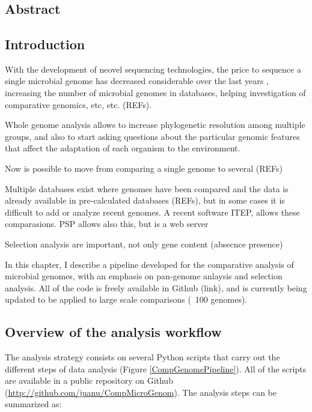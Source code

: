 \chapter{}

\section{Abstract}

\section{Introduction}

With the development of neovel sequencing technologies, the price to sequence a single microbial genome has decreased considerable over the last years \cite{Mardis:2013gn}, increasing the number of microbial genomes in databases, helping investigation of comparative genomics, etc, etc. (REFs). 

Whole genome analysis allows to increase phylogenetic resolution among multiple groups, and also to start asking questions about the particular genomic features that affect the adaptation of each organism to the environment.

Now is possible to move from comparing a single genome to several (REFs)

Multiple databases exist where genomes have been compared and the data is already available in pre-calculated databases (REFs), but in some cases it is difficult to add or analyze recent genomes. A recent software ITEP, allows these comparasions. PSP allows also this, but is a web server

Selection analysis are important, not only gene content (absecnce presence)

In this chapter, I describe a pipeline developed for the comparative analysis of microbial genomes, with an emphasis on pan-genome anlaysis and selection analysis. All of the code is freely available in Github (link), and is currently being updated to be applied to large scale comparisons (~100 genomes).

\section{Overview of the analysis workflow}

The analysis strategy consists on several Python scripts that carry out the different steps of data analysis (Figure \ref{CompGenomePipeline}). All of the scripts are available in a public repository on Github (\url{http://github.com/juanu/CompMicroGenom}). The analysis steps can be summarized as:

